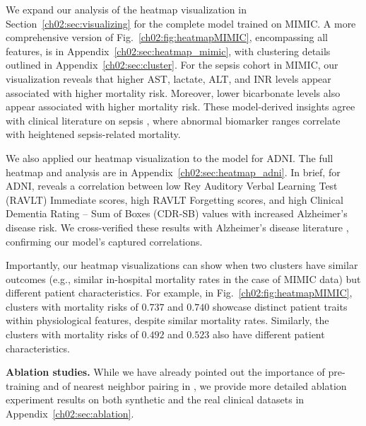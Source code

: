 We expand our analysis of the heatmap visualization in Section~\ref{ch02:sec:visualizing} for the complete  model trained on MIMIC.
A more comprehensive version of Fig.~\ref{ch02:fig:heatmapMIMIC}, encompassing all features, is in Appendix~\ref{ch02:sec:heatmap_mimic}, with clustering details outlined in Appendix~\ref{ch02:sec:cluster}. 
For the sepsis cohort in MIMIC, our visualization reveals that higher AST, lactate, ALT, and INR levels appear associated with higher mortality risk.
Moreover, lower bicarbonate levels also appear associated with higher mortality risk.
These model-derived insights agree with clinical literature on sepsis \citep{nesseler2012clinical, villar2019lactate}, where abnormal biomarker ranges correlate with heightened sepsis-related mortality.

We also applied our heatmap visualization to the  model for ADNI.
The full heatmap and analysis are in Appendix~\ref{ch02:sec:heatmap_adni}.
In brief, for ADNI,  reveals a correlation between low Rey Auditory Verbal Learning Test (RAVLT) Immediate scores, high RAVLT Forgetting scores, and high Clinical Dementia Rating – Sum of Boxes (CDR-SB) values with increased Alzheimer's disease risk.
We cross-verified these results with Alzheimer's disease literature \citep{o2008staging, moradi2017rey}, confirming our model's captured correlations.

Importantly, our heatmap visualizations can show when two clusters have similar outcomes (e.g., similar in-hospital mortality rates in the case of MIMIC data) but different patient characteristics.
For example, in Fig.~\ref{ch02:fig:heatmapMIMIC}, clusters with mortality risks of $0.737$ and $0.740$ showcase distinct patient traits within physiological features, despite similar mortality rates.
Similarly, the clusters with mortality risks of $0.492$ and $0.523$ also have different patient characteristics.



\noindent
\textbf{Ablation studies.}
While we have already pointed out the importance of pre-training and of nearest neighbor pairing in , we provide more detailed ablation experiment results on both synthetic and the real clinical datasets in Appendix~\ref{ch02:sec:ablation}.

 
